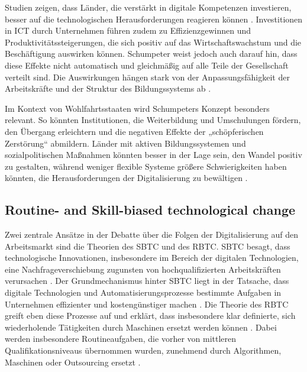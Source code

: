 Studien zeigen, dass Länder, die verstärkt in digitale Kompetenzen investieren, besser auf die 
technologischen Herausforderungen reagieren können \parencite[S. 15–17]{oecd2019measuring}. 
Investitionen in \ac{ICT} durch Unternehmen führen zudem zu Effizienzgewinnen und 
Produktivitätssteigerungen, die sich positiv auf das Wirtschaftswachstum und die Beschäftigung 
auswirken können. Schumpeter weist jedoch auch darauf hin, dass diese Effekte nicht automatisch 
und gleichmäßig auf alle Teile der Gesellschaft verteilt sind. Die Auswirkungen hängen stark von 
der Anpassungsfähigkeit der Arbeitskräfte und der Struktur des Bildungssystems ab 
\parencite[S. 48]{oecd2019measuring}.

Im Kontext von Wohlfahrtsstaaten wird Schumpeters Konzept besonders relevant. So könnten 
Institutionen, die Weiterbildung und Umschulungen fördern, den Übergang erleichtern und die 
negativen Effekte der „schöpferischen Zerstörung“ abmildern. Länder mit aktiven Bildungssystemen 
und sozialpolitischen Maßnahmen könnten besser in der Lage sein, den Wandel positiv zu gestalten, 
während weniger flexible Systeme größere Schwierigkeiten haben könnten, die Herausforderungen der 
Digitalisierung zu bewältigen \parencite[vgl.][S. 29–31]{espingandersen1990thethree}.


\subsection{Routine- and Skill-biased technological change}


Zwei zentrale Ansätze in der Debatte über die Folgen der Digitalisierung auf den Arbeitsmarkt sind 
die Theorien des \ac{SBTC} und des \ac{RBTC}. \ac{SBTC} besagt, dass technologische Innovationen, 
insbesondere im Bereich der digitalen Technologien, eine Nachfrageverschiebung zugunsten von 
hochqualifizierten Arbeitskräften verursachen \parencite[vgl.][S. 1]{violante2008skill}. Der 
Grundmechanismus hinter \ac{SBTC} liegt in der Tatsache, dass digitale Technologien und 
Automatisierungsprozesse bestimmte Aufgaben in Unternehmen effizienter und kostengünstiger machen 
\parencite[vgl.][S. 2–3]{violante2008skill}. Die Theorie des \ac{RBTC} greift eben diese Prozesse 
auf und erklärt, dass insbesondere klar definierte, sich wiederholende Tätigkeiten durch 
Maschinen ersetzt werden können \parencite[vgl.][S. 2509–2510]{goos2014explaining}. Dabei werden 
insbesondere Routineaufgaben, die vorher von mittleren Qualifikationsniveaus übernommen wurden, 
zunehmend durch Algorithmen, Maschinen oder Outsourcing ersetzt 
\parencite[vgl.][S. 1279]{autor2003theskill}.

